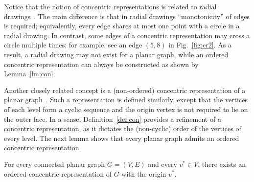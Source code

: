 \documentclass[orivec]{llncs}
\begin{document}
Notice that the notion of concentric representations is related to radial drawings~\cite{BBF05}. 
The main difference is that in radial drawings ``monotonicity'' of edges is required;
equivalently, every edge shares at most one point with a circle in a radial drawing. In contrast, some edges of
a concentric representation may cross a circle multiple times; for example, see an
edge $(5, 8)$ in Fig.~\ref{fig:cr2}. As a result, a radial drawing may not exist for a planar graph, while
an ordered concentric representation can always be constructed as shown by Lemma~\ref{lm:con}.

Another closely related concept is a (non-ordered) concentric representation of a planar graph~\cite{Ull84,Hro13}.
Such a representation is defined similarly, except that the vertices of each level form a cyclic sequence and
the origin vertex is not required to lie on the outer face. In a sense, Definition~\ref{def:con} provides a
refinement of a concentric representation, as it dictates the (non-cyclic) order of the vertices of every level.
The next lemma shows that every planar graph admits an ordered concentric representation.


\begin{lemma}
    \label{lm:con}    
    For every connected planar graph $G=(V, E)$ and every $v^* \in V$, there exists an ordered concentric representation of $G$ 
    with the origin $v^*$.
\end{lemma}    
\end{document}
